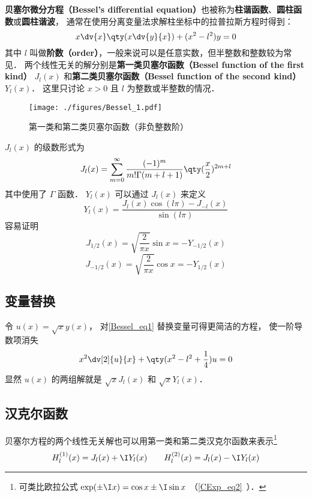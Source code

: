 

\textbf{贝塞尔微分方程（Bessel's differential equation）}也被称为\textbf{柱谐函数}、\textbf{圆柱函数}或\textbf{圆柱谐波}， 通常在使用分离变量法求解柱坐标中的拉普拉斯方程时得到：
\begin{equation}\label{Bessel_eq1}
x\dv{x}\qty(x\dv{y}{x}) + (x^2 - l ^2)y = 0
\end{equation}
其中 $l$ 叫做\textbf{阶数（order）}，一般来说可以是任意实数，但半整数和整数较为常见． 两个线性无关的解分别是\textbf{第一类贝塞尔函数（Bessel function of the first kind）} $J_l(x)$ 和\textbf{第二类贝塞尔函数（Bessel function of the second kind）} $Y_l(x)$． 这里只讨论 $x > 0$ 且 $l$ 为整数或半整数的情况．

\begin{figure}[ht]
\centering
\texttt{[image: ./figures/Bessel\_1.pdf]}
\caption{第一类和第二类贝塞尔函数（非负整数阶）} \label{Bessel_fig1}
\end{figure}

$J_l(x)$ 的级数形式为
\begin{equation}\label{Bessel_eq3}
J_l(x) = \sum_{m=0}^\infty \frac{(-1)^m}{m!\Gamma(m+l+1)} \qty(\frac x2)^{2m+l}
\end{equation}
其中使用了 $\Gamma$ 函数． $Y_l(x)$ 可以通过 $J_l(x)$ 来定义
\begin{equation}
Y_l(x) = \frac{J_l(x)\cos(l\pi) - J_{-l}(x)}{\sin(l\pi)}
\end{equation}
容易证明
\begin{equation}
J_{1/2}(x) = \sqrt{\frac{2}{\pi x}} \sin x = -Y_{-1/2}(x)
\end{equation}
\begin{equation}
J_{-1/2}(x) = \sqrt{\frac{2}{\pi x}} \cos x = -Y_{1/2}(x)
\end{equation}

\subsection{变量替换}
令 $u(x) = \sqrt{x} y(x)$， 对\autoref{Bessel_eq1} 替换变量可得更简洁的方程， 使一阶导数项消失
\begin{equation}
x^2\dv[2]{u}{x} + \qty(x^2 - l^2 + \frac{1}{4}) u = 0
\end{equation}
显然 $u(x)$ 的两组解就是 $\sqrt{x}J_l(x)$ 和 $\sqrt{x}Y_l(x)$．

\subsection{汉克尔函数}
贝塞尔方程的两个线性无关解也可以用第一类和第二类汉克尔函数来表示\footnote{可类比欧拉公式 $\exp(\pm\I x) = \cos x \pm \I\sin x$ （\autoref{CExp_eq2}~）．}
\begin{equation}
H_l ^{(1)}(x) = J_l(x) + \I Y_l(x)
\qquad
H_l ^{(2)}(x) = J_l(x) - \I Y_l(x)
\end{equation}

